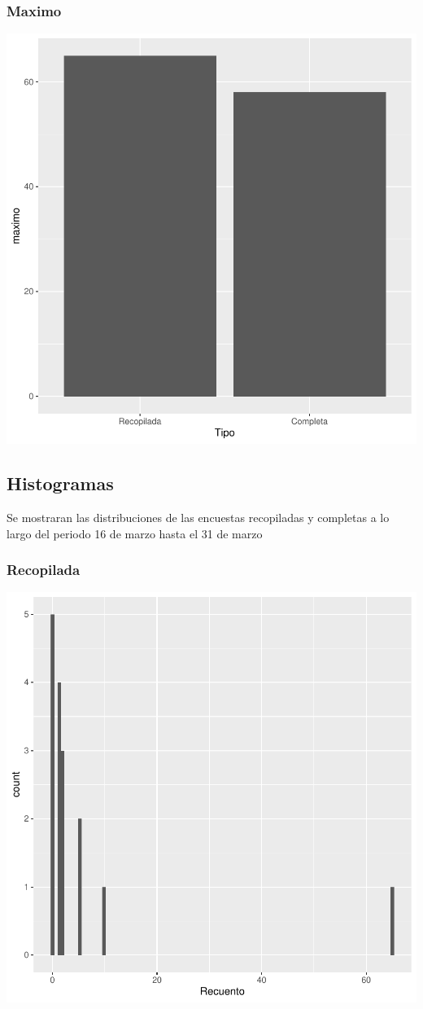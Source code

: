 \documentclass{article}
\begin{document}
\subsubsection{Maximo}

\includegraphics{seguimento2-059}

\subsection{Histogramas}
Se mostraran las distribuciones de las encuestas recopiladas y completas a lo largo del periodo 16 de marzo hasta el 31 de marzo

\subsubsection{Recopilada}

\includegraphics{seguimento2-060}
\end{document}
